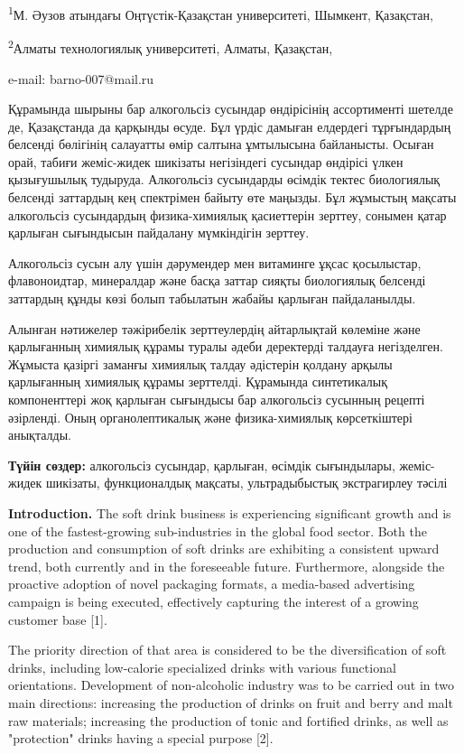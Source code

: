 \textsuperscript{1}М. Әузов атындағы Оңтүстік-Қазақстан университеті,
Шымкент, Қазақстан,

\textsuperscript{2}Алматы технологиялық университеті, Алматы, Қазақстан,

e-mail: barno-007@mail.ru

Құрамында шырыны бар алкогольсіз сусындар өндірісінің ассортименті
шетелде де, Қазақстанда да қарқынды өсуде. Бұл үрдіс дамыған елдердегі
тұрғындардың белсенді бөлігінің салауатты өмір салтына ұмтылысына
байланысты. Осыған орай, табиғи жеміс-жидек шикізаты негізіндегі
сусындар өндірісі үлкен қызығушылық тудыруда. Алкогольсіз сусындарды
өсімдік тектес биологиялық белсенді заттардың кең спектрімен байыту өте
маңызды. Бұл жұмыстың мақсаты алкогольсіз сусындардың физика-химиялық
қасиеттерін зерттеу, сонымен қатар қарлыған сығындысын пайдалану
мүмкіндігін зерттеу.

Алкогольсіз сусын алу үшін дәрумендер мен витаминге ұқсас қосылыстар,
флавоноидтар, минералдар және басқа заттар сияқты биологиялық белсенді
заттардың құнды көзі болып табылатын жабайы қарлыған пайдаланылды.

Алынған нәтижелер тәжірибелік зерттеулердің айтарлықтай көлеміне және
қарлығанның химиялық құрамы туралы әдеби деректерді талдауға
негізделген. Жұмыста қазіргі заманғы химиялық талдау әдістерін қолдану
арқылы қарлығанның химиялық құрамы зерттелді. Құрамында синтетикалық
компоненттері жоқ қарлыған сығындысы бар алкогольсіз сусынның рецепті
әзірленді. Оның органолептикалық және физика-химиялық көрсеткіштері
анықталды.

{\bfseries Түйін сөздер:} алкогольсіз сусындар, қарлыған, өсімдік
сығындылары, жеміс-жидек шикізаты, функционалдық мақсаты, ультрадыбыстық
экстрагирлеу тәсілі

{\bfseries Introduction.} The soft drink business is experiencing
significant growth and is one of the fastest-growing sub-industries in
the global food sector. Both the production and consumption of soft
drinks are exhibiting a consistent upward trend, both currently and in
the foreseeable future. Furthermore, alongside the proactive adoption of
novel packaging formats, a media-based advertising campaign is being
executed, effectively capturing the interest of a growing customer base
{[}1{]}.

The priority direction of that area is considered to be the
diversification of soft drinks, including low-calorie specialized drinks
with various functional orientations. Development of non-alcoholic
industry was to be carried out in two main directions: increasing the
production of drinks on fruit and berry and malt raw materials;
increasing the production of tonic and fortified drinks, as well as
"protection" drinks having a special purpose {[}2{]}.

